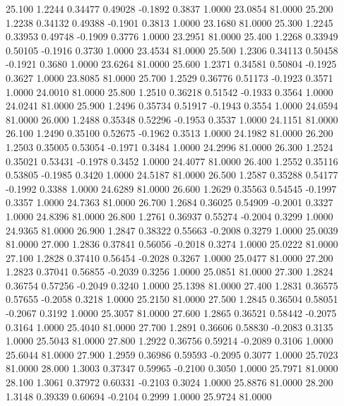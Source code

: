   25.100   1.2244   0.34477   0.49028  -0.1892   0.3837   1.0000  23.0854  81.0000
  25.200   1.2238   0.34132   0.49388  -0.1901   0.3813   1.0000  23.1680  81.0000
  25.300   1.2245   0.33953   0.49748  -0.1909   0.3776   1.0000  23.2951  81.0000
  25.400   1.2268   0.33949   0.50105  -0.1916   0.3730   1.0000  23.4534  81.0000
  25.500   1.2306   0.34113   0.50458  -0.1921   0.3680   1.0000  23.6264  81.0000
  25.600   1.2371   0.34581   0.50804  -0.1925   0.3627   1.0000  23.8085  81.0000
  25.700   1.2529   0.36776   0.51173  -0.1923   0.3571   1.0000  24.0010  81.0000
  25.800   1.2510   0.36218   0.51542  -0.1933   0.3564   1.0000  24.0241  81.0000
  25.900   1.2496   0.35734   0.51917  -0.1943   0.3554   1.0000  24.0594  81.0000
  26.000   1.2488   0.35348   0.52296  -0.1953   0.3537   1.0000  24.1151  81.0000
  26.100   1.2490   0.35100   0.52675  -0.1962   0.3513   1.0000  24.1982  81.0000
  26.200   1.2503   0.35005   0.53054  -0.1971   0.3484   1.0000  24.2996  81.0000
  26.300   1.2524   0.35021   0.53431  -0.1978   0.3452   1.0000  24.4077  81.0000
  26.400   1.2552   0.35116   0.53805  -0.1985   0.3420   1.0000  24.5187  81.0000
  26.500   1.2587   0.35288   0.54177  -0.1992   0.3388   1.0000  24.6289  81.0000
  26.600   1.2629   0.35563   0.54545  -0.1997   0.3357   1.0000  24.7363  81.0000
  26.700   1.2684   0.36025   0.54909  -0.2001   0.3327   1.0000  24.8396  81.0000
  26.800   1.2761   0.36937   0.55274  -0.2004   0.3299   1.0000  24.9365  81.0000
  26.900   1.2847   0.38322   0.55663  -0.2008   0.3279   1.0000  25.0039  81.0000
  27.000   1.2836   0.37841   0.56056  -0.2018   0.3274   1.0000  25.0222  81.0000
  27.100   1.2828   0.37410   0.56454  -0.2028   0.3267   1.0000  25.0477  81.0000
  27.200   1.2823   0.37041   0.56855  -0.2039   0.3256   1.0000  25.0851  81.0000
  27.300   1.2824   0.36754   0.57256  -0.2049   0.3240   1.0000  25.1398  81.0000
  27.400   1.2831   0.36575   0.57655  -0.2058   0.3218   1.0000  25.2150  81.0000
  27.500   1.2845   0.36504   0.58051  -0.2067   0.3192   1.0000  25.3057  81.0000
  27.600   1.2865   0.36521   0.58442  -0.2075   0.3164   1.0000  25.4040  81.0000
  27.700   1.2891   0.36606   0.58830  -0.2083   0.3135   1.0000  25.5043  81.0000
  27.800   1.2922   0.36756   0.59214  -0.2089   0.3106   1.0000  25.6044  81.0000
  27.900   1.2959   0.36986   0.59593  -0.2095   0.3077   1.0000  25.7023  81.0000
  28.000   1.3003   0.37347   0.59965  -0.2100   0.3050   1.0000  25.7971  81.0000
  28.100   1.3061   0.37972   0.60331  -0.2103   0.3024   1.0000  25.8876  81.0000
  28.200   1.3148   0.39339   0.60694  -0.2104   0.2999   1.0000  25.9724  81.0000
